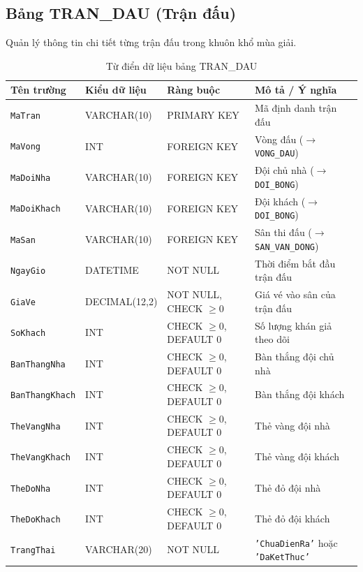 \subsection{Bảng TRAN\_DAU (Trận đấu)}
Quản lý thông tin chi tiết từng trận đấu trong khuôn khổ mùa giải.
\begin{table}[H]
\centering
\small
\begin{tabular}{|l|l|l|p{6cm}|}
\hline
\textbf{Tên trường} & \textbf{Kiểu dữ liệu} & \textbf{Ràng buộc} & \textbf{Mô tả / Ý nghĩa} \\ \hline
\texttt{MaTran} & VARCHAR(10) & PRIMARY KEY & Mã định danh trận đấu \\ \hline
\texttt{MaVong} & INT & FOREIGN KEY & Vòng đấu ($\rightarrow$ \texttt{VONG\_DAU}) \\ \hline
\texttt{MaDoiNha} & VARCHAR(10) & FOREIGN KEY & Đội chủ nhà ($\rightarrow$ \texttt{DOI\_BONG}) \\ \hline
\texttt{MaDoiKhach} & VARCHAR(10) & FOREIGN KEY & Đội khách ($\rightarrow$ \texttt{DOI\_BONG}) \\ \hline
\texttt{MaSan} & VARCHAR(10) & FOREIGN KEY & Sân thi đấu ($\rightarrow$ \texttt{SAN\_VAN\_DONG}) \\ \hline
\texttt{NgayGio} & DATETIME & NOT NULL & Thời điểm bắt đầu trận đấu \\ \hline
\texttt{GiaVe} & DECIMAL(12,2) & NOT NULL, CHECK $\ge 0$ & Giá vé vào sân của trận đấu \\ \hline
\texttt{SoKhach} & INT & CHECK $\ge 0$, DEFAULT 0 & Số lượng khán giả theo dõi \\ \hline
\texttt{BanThangNha} & INT & CHECK $\ge 0$, DEFAULT 0 & Bàn thắng đội chủ nhà \\ \hline
\texttt{BanThangKhach} & INT & CHECK $\ge 0$, DEFAULT 0 & Bàn thắng đội khách \\ \hline
\texttt{TheVangNha} & INT & CHECK $\ge 0$, DEFAULT 0 & Thẻ vàng đội nhà \\ \hline
\texttt{TheVangKhach} & INT & CHECK $\ge 0$, DEFAULT 0 & Thẻ vàng đội khách \\ \hline
\texttt{TheDoNha} & INT & CHECK $\ge 0$, DEFAULT 0 & Thẻ đỏ đội nhà \\ \hline
\texttt{TheDoKhach} & INT & CHECK $\ge 0$, DEFAULT 0 & Thẻ đỏ đội khách \\ \hline
\texttt{TrangThai} & VARCHAR(20) & NOT NULL & \texttt{'ChuaDienRa'} hoặc \texttt{'DaKetThuc'} \\ \hline
\end{tabular}
\caption{Từ điển dữ liệu bảng TRAN\_DAU}
\end{table}

